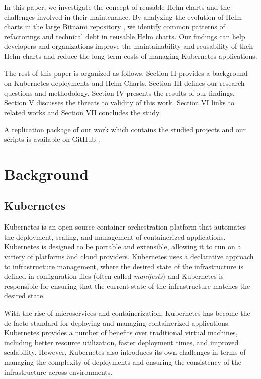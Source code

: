 \documentclass[conference]{IEEEtran}
\begin{document}
In this paper, we investigate the concept of reusable Helm charts and the challenges involved in their maintenance. By analyzing the evolution of Helm charts in the large Bitnami repository \cite{bitnami}, we identify common patterns of refactorings and technical debt in reusable Helm charts. Our findings can help developers and organizations improve the maintainability and reusability of their Helm charts and reduce the long-term costs of managing Kubernetes applications.

The rest of this paper is organized as follows. Section II provides a background on Kubernetes deployments and Helm Charts. Section III defines our research questions and methodology. Section IV presents the results of our findings. Section V discusses the threats to validity of this work. Section VI links to related works and Section VII concludes the study.

A replication package of our work which contains the studied projects and our scripts is available on GitHub \cite{replipkg}.

\section{Background}

\subsection{Kubernetes}

Kubernetes \cite{kubernetes} is an open-source container orchestration platform that automates the deployment, scaling, and management of containerized applications. Kubernetes is designed to be portable and extensible, allowing it to run on a variety of platforms and cloud providers. Kubernetes uses a declarative approach to infrastructure management, where the desired state of the infrastructure is defined in configuration files (often called \textit{manifests}) and Kubernetes is responsible for ensuring that the current state of the infrastructure matches the desired state.

With the rise of microservices and containerization, Kubernetes has become the de facto standard for deploying and managing containerized applications. Kubernetes provides a number of benefits over traditional virtual machines, including better resource utilization, faster deployment times, and improved scalability. However, Kubernetes also introduces its own challenges in terms of managing the complexity of deployments and ensuring the consistency of the infrastructure across environments.
\end{document}

